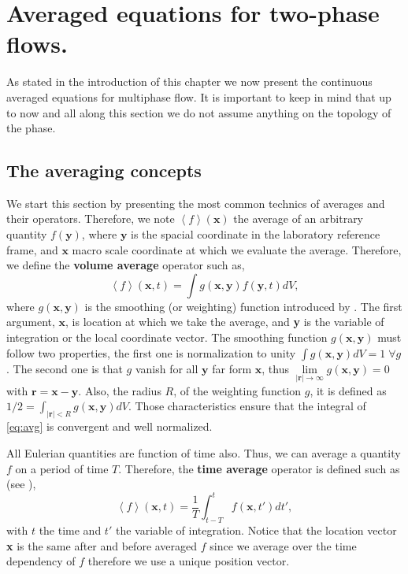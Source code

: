 
\section{Averaged equations for two-phase flows.}
\label{sec:introavg}

As stated in the introduction of this chapter we now present the continuous averaged equations for multiphase flow. 
It is important to keep in mind that up to now and all along this section we do not assume anything on the topology of the phase.


\subsection{The averaging concepts}

We start this section by presenting the most common technics of averages and their operators. 
Therefore, we note $\left<f\right>(\textbf{x})$ the average of an arbitrary quantity $f(\textbf{y})$, 
where $\textbf{y}$ is the spacial coordinate in the laboratory reference frame, 
and $\textbf{x}$ macro scale coordinate at which we evaluate the average.
Therefore, we define the \textbf{volume average} operator such as,
\begin{equation}
    \left<f\right>(\textbf{x},t) = \int g(\textbf{x},\textbf{y}) f(\textbf{y},t)dV,
    \label{eq:avg}
\end{equation}
where $g(\textbf{x},\textbf{y})$ is the smoothing (or weighting) function introduced by 
\citet{jackson1997locally,marle1982macroscopic}.
The first argument, $\textbf{x}$, is location at which we take the average, and \textbf{y} is the variable of integration or the local coordinate vector.
The smoothing function $g(\textbf{x},\textbf{y})$ must follow two properties, the first one is normalization to unity 
$\int g(\textbf{x},\textbf{y}) dV = 1 \;\forall g$.
The second one is that $g$ vanish for all $\textbf{y}$ far form $\textbf{x}$, thus $\lim\limits_{|\textbf{r}| \to \infty} g(\textbf{x},\textbf{y}) = 0$ with $\textbf{r} = \textbf{x} - \textbf{y}$.
Also, the radius $R$, of the weighting function $g$, it is defined as $1/2 = \int_{|\textbf{r}|<R} g(\textbf{x},\textbf{y})dV$.
Those characteristics ensure that the integral of \ref{eq:avg} is convergent and well normalized. 

All Eulerian quantities are function of time also. 
Thus, we can average a quantity $f$ on a period of time $T$. 
Therefore, the \textbf{time average} operator is defined such as (see \citet{morel2015mathematical,drew1983mathematical,ishii2010thermo}), 
\begin{equation*}
    \left<f\right>(\textbf{x},t) = \frac{1}{T}\int_{t-T}^t f(\textbf{x},t')dt',
\end{equation*}
with $t$ the time and $t'$ the variable of integration.
Notice that the location vector \textbf{x} is the same after and before averaged $f$ since we average over the time dependency of $f$ therefore we use a unique position vector.  

